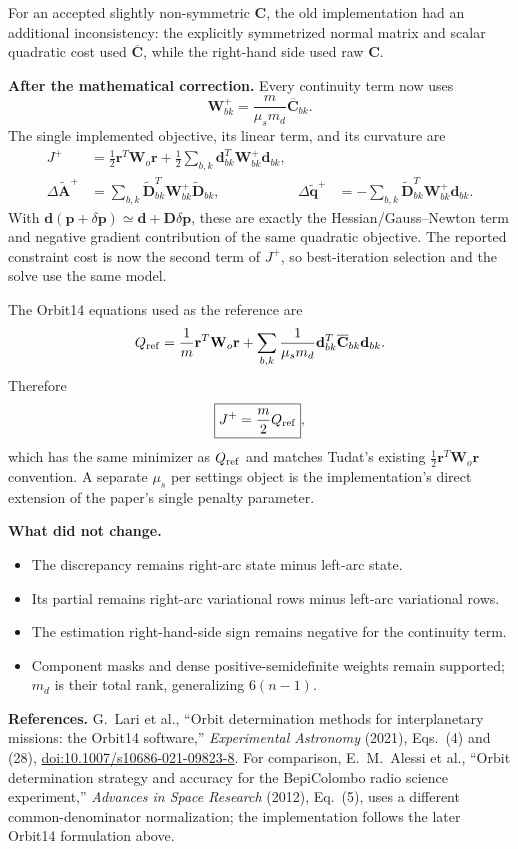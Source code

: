 \documentclass[10pt]{article}
\newcommand{\Cbar}{\overline{\mathbf C}}
\newcommand{\Dt}{\widetilde{\mathbf D}}
\begin{document}
For an accepted slightly non-symmetric $\mathbf C$, the old implementation had an additional inconsistency:
the explicitly symmetrized normal matrix and scalar quadratic cost used $\Cbar$, while the right-hand side used
raw $\mathbf C$.

\newpage
\textbf{After the mathematical correction.}
Every continuity term now uses
\[
 \boxed{\mathbf W^+_{bk}=\frac{m}{\mu_s m_d}\Cbar_{bk}}.
\]
The single implemented objective, its linear term, and its curvature are
\begin{align*}
 J^+ &= \tfrac12\mathbf r^T\mathbf W_o\mathbf r
       +\tfrac12\sum_{b,k}\mathbf d_{bk}^{T}\mathbf W^+_{bk}\mathbf d_{bk},\\
 \Delta\widetilde{\mathbf A}^{+}
 &=\sum_{b,k}\Dt_{bk}^{T}\mathbf W^+_{bk}\Dt_{bk},&
 \Delta\widetilde{\mathbf q}^{+}
 &=-\sum_{b,k}\Dt_{bk}^{T}\mathbf W^+_{bk}\mathbf d_{bk}.
\end{align*}
With $\mathbf d(\mathbf p+\delta\mathbf p)\simeq\mathbf d+\mathbf D\delta\mathbf p$, these are exactly the
Hessian/Gauss--Newton term and negative gradient contribution of the same quadratic objective.  The reported
constraint cost is now the second term of $J^+$, so best-iteration selection and the solve use the same model.

The Orbit14 equations used as the reference are
\[
 Q_{\rm ref}=\frac{1}{m}\mathbf r^T\mathbf W_o\mathbf r
 +\sum_{b,k}\frac{1}{\mu_s m_d}\mathbf d_{bk}^{T}\Cbar_{bk}\mathbf d_{bk}.
\]
Therefore
\[
 \boxed{J^+=\frac{m}{2}Q_{\rm ref}},
\]
which has the same minimizer as $Q_{\rm ref}$ and matches Tudat's existing
$\tfrac12\mathbf r^T\mathbf W_o\mathbf r$ convention.  A separate $\mu_s$ per settings object is the
implementation's direct extension of the paper's single penalty parameter.

\textbf{What did not change.}
\begin{itemize}
 \item The discrepancy remains right-arc state minus left-arc state.
 \item Its partial remains right-arc variational rows minus left-arc variational rows.
 \item The estimation right-hand-side sign remains negative for the continuity term.
 \item Component masks and dense positive-semidefinite weights remain supported; $m_d$ is their total rank,
       generalizing $6(n-1)$.
\end{itemize}

\textbf{References.}
G.~Lari et al., ``Orbit determination methods for interplanetary missions: the Orbit14 software,''
\emph{Experimental Astronomy} (2021), Eqs.~(4) and (28),
\href{https://doi.org/10.1007/s10686-021-09823-8}{doi:10.1007/s10686-021-09823-8}.
For comparison, E.~M.~Alessi et al., ``Orbit determination strategy and accuracy for the BepiColombo radio
science experiment,'' \emph{Advances in Space Research} (2012), Eq.~(5), uses a different common-denominator
normalization; the implementation follows the later Orbit14 formulation above.
\end{document}
